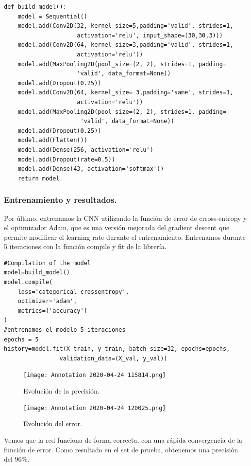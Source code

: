 \documentclass[a4paper,11pt]{article}
\begin{document}
\begin{lstlisting}
def build_model():
    model = Sequential()
    model.add(Conv2D(32, kernel_size=5,padding='valid', strides=1, 
                     activation='relu', input_shape=(30,30,3)))
    model.add(Conv2D(64, kernel_size=3,padding='valid', strides=1,
                     activation='relu'))
    model.add(MaxPooling2D(pool_size=(2, 2), strides=1, padding=
                     'valid', data_format=None))
    model.add(Dropout(0.25))
    model.add(Conv2D(64, kernel_size= 3,padding='same', strides=1, 
                     activation='relu'))
    model.add(MaxPooling2D(pool_size=(2, 2), strides=1, padding=
                      'valid', data_format=None))
    model.add(Dropout(0.25))
    model.add(Flatten())
    model.add(Dense(256, activation='relu')
    model.add(Dropout(rate=0.5))
    model.add(Dense(43, activation='softmax'))
    return model
\end{lstlisting}

\subsubsection{Entrenamiento y resultados.}
Por último, entrenamos la CNN utilizando  la función de error de crross-entropy y el optimizador Adam, que es una versión mejorada del gradient descent que permite modificar el learning rate durante el entrenamiento. Entrenamos durante 5 iteraciones con la función compile y fit de la librería.
\begin{lstlisting}
#Compilation of the model
model=build_model()
model.compile(
    loss='categorical_crossentropy', 
    optimizer='adam', 
    metrics=['accuracy']
)
#entrenamos el modelo 5 iteraciones
epochs = 5
history=model.fit(X_train, y_train, batch_size=32, epochs=epochs,
				validation_data=(X_val, y_val))
\end{lstlisting}

\begin{figure}[H]
\begin{minipage}[b]{0.5\linewidth}
\centering
\texttt{[image: Annotation 2020-04-24 115814.png]}
\caption{Evolución de la precisión.}
\label{fig:figura1}
\end{minipage}
\hspace{0.5cm}
\begin{minipage}[b]{0.5\linewidth}
\centering
\texttt{[image: Annotation 2020-04-24 120025.png]}
\caption{Evolución del error.}
\label{fig:figura2}
\end{minipage}
\end{figure}
\noindent
Vemos que la red funciona de forma correcta, con una rápida convergencia de la función de error. Como resultado en el set de prueba, obtenemos una precisión del 96\%.
\end{document}
